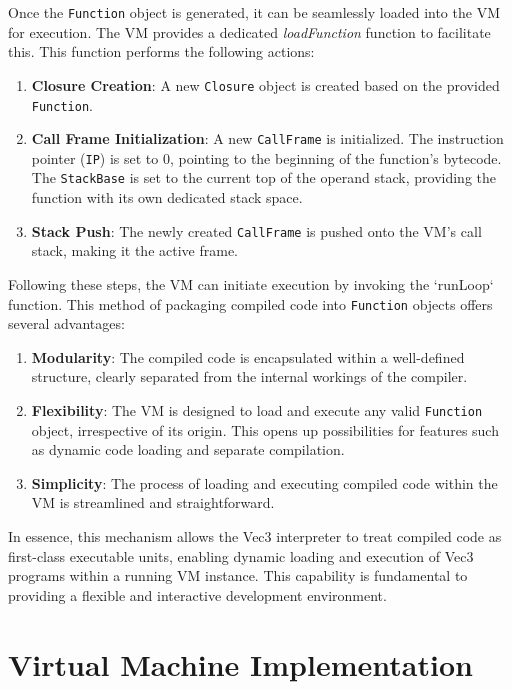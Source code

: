 Once the \texttt{Function} object is generated, it can be seamlessly loaded into the VM for execution.
The VM provides a dedicated \textit{loadFunction} function to facilitate this.
This function performs the following actions:

\begin{enumerate}
    \item \textbf{Closure Creation}: A new \texttt{Closure} object is created based on the provided \texttt{Function}.
    \item \textbf{Call Frame Initialization}: A new \texttt{CallFrame} is initialized.
    The instruction pointer (\texttt{IP}) is set to 0, pointing to the beginning of the function's bytecode.
    The \texttt{StackBase} is set to the current top of the operand stack, providing the function with its own dedicated stack space.
    \item \textbf{Stack Push}: The newly created \texttt{CallFrame} is pushed onto the VM's call stack, making it the active frame.
\end{enumerate}

Following these steps, the VM can initiate execution by invoking the `runLoop` function.
This method of packaging compiled code into \texttt{Function} objects offers several advantages:

\begin{enumerate}
    \item \textbf{Modularity}: The compiled code is encapsulated within a well-defined structure, clearly separated from the internal workings of the compiler.
    \item \textbf{Flexibility}: The VM is designed to load and execute any valid \texttt{Function} object, irrespective of its origin.
    This opens up possibilities for features such as dynamic code loading and separate compilation.
    \item \textbf{Simplicity}: The process of loading and executing compiled code within the VM is streamlined and straightforward.
\end{enumerate}
In essence, this mechanism allows the Vec3 interpreter to treat compiled code as first-class executable units, enabling dynamic loading and execution of Vec3 programs within a running VM instance.
This capability is fundamental to providing a flexible and interactive development environment.

\section{Virtual Machine Implementation}
\label{sec:virtual-machine}

